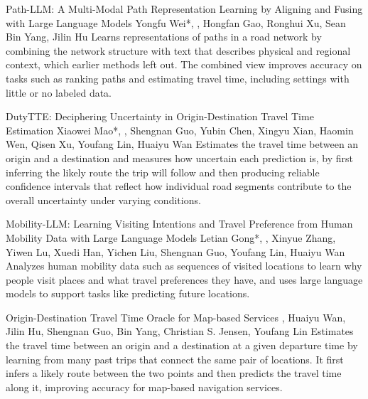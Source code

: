 {Path-LLM: A Multi-Modal Path Representation Learning by Aligning and Fusing with Large Language Models}
{Yongfu Wei*, \me*, Hongfan Gao, Ronghui Xu, Sean Bin Yang, Jilin Hu}
{Learns representations of paths in a road network by combining the network structure with text that describes physical and regional context, which earlier methods left out. The combined view improves accuracy on tasks such as ranking paths and estimating travel time, including settings with little or no labeled data.}

{DutyTTE: Deciphering Uncertainty in Origin-Destination Travel Time Estimation}
{Xiaowei Mao*, \me*, Shengnan Guo, Yubin Chen, Xingyu Xian, Haomin Wen, Qisen Xu, Youfang Lin, Huaiyu Wan}
{Estimates the travel time between an origin and a destination and measures how uncertain each prediction is, by first inferring the likely route the trip will follow and then producing reliable confidence intervals that reflect how individual road segments contribute to the overall uncertainty under varying conditions.}

{Mobility-LLM: Learning Visiting Intentions and Travel Preference from Human Mobility Data with Large Language Models}
{Letian Gong*, \me*, Xinyue Zhang, Yiwen Lu, Xuedi Han, Yichen Liu, Shengnan Guo, Youfang Lin, Huaiyu Wan}
{Analyzes human mobility data such as sequences of visited locations to learn why people visit places and what travel preferences they have, and uses large language models to support tasks like predicting future locations.}

{Origin-Destination Travel Time Oracle for Map-based Services}
{\me, Huaiyu Wan, Jilin Hu, Shengnan Guo, Bin Yang, Christian S. Jensen, Youfang Lin}
{Estimates the travel time between an origin and a destination at a given departure time by learning from many past trips that connect the same pair of locations. It first infers a likely route between the two points and then predicts the travel time along it, improving accuracy for map-based navigation services.}

